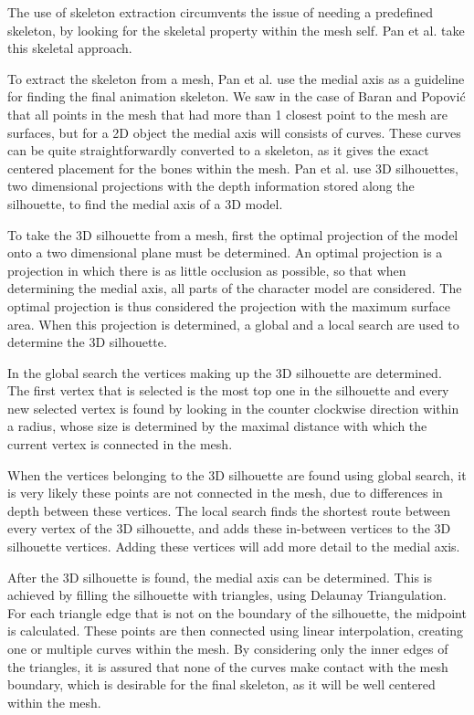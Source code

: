 \documentclass{article}
\begin{document}
The use of skeleton extraction circumvents the issue of needing a predefined
skeleton, by looking for the skeletal property within the mesh self. Pan et al.
\citep{paper2} take this skeletal approach.

To extract the skeleton from a mesh, Pan et al. use the medial axis as a
guideline for finding the final animation skeleton.
We saw in the case of Baran and Popovi\'{c} that all points in the mesh that had
more than 1 closest point to the mesh are surfaces, but for a 2D object the medial axis will consists of
curves. These curves can be quite straightforwardly converted to a skeleton, as
it gives the exact centered placement for the bones within the mesh. Pan et al.
use 3D silhouettes, two dimensional projections with the depth information stored along
the silhouette, to find the medial axis of a 3D model.

To take the 3D silhouette from a mesh, first the optimal projection of the model
onto a two dimensional plane must be determined. An optimal projection is a
projection in which there is as little occlusion as possible, so that when
determining the medial axis, all parts of the character model are considered.
The optimal projection is thus considered the projection with the maximum
surface area. When this projection is determined, a global and a local search
are used to determine the 3D silhouette. 

In the global search the vertices making up the 3D silhouette are determined. 
The first vertex that is selected is the most top one in the silhouette and
every new selected vertex is found by looking in the counter clockwise
direction within a radius, whose size is determined by the maximal distance with
which the current vertex is connected in the mesh. 

When the vertices belonging to the 3D silhouette are found using global search,
it is very likely these points are not connected in the mesh, due to
differences in depth between these vertices. The local search finds the shortest
route between every vertex of the 3D silhouette, and adds these in-between
vertices to the 3D silhouette vertices. Adding these vertices will add more
detail to the medial axis. %

After the 3D silhouette is found, the medial axis can be determined. This is
achieved by filling the silhouette with triangles, using Delaunay
Triangulation. For each triangle edge that is not on the boundary of the
silhouette, the midpoint is calculated. These points are then connected using
linear interpolation, creating one or multiple curves within the mesh. By
considering only the inner edges of the triangles, it is assured that none of
the curves make contact with the mesh boundary, which is desirable for the final
skeleton, as it will be well centered within the mesh.
\end{document}
